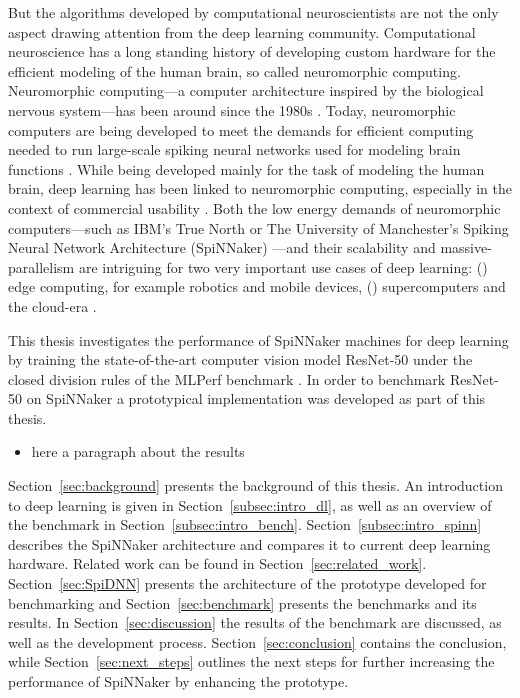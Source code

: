 \documentclass[]{article}
\begin{document}
But the algorithms developed by computational neuroscientists are not
the only aspect drawing attention from the deep learning community.
Computational neuroscience has a long standing history of
developing custom hardware for the efficient modeling of the human
brain, so called neuromorphic computing. Neuromorphic computing---a
computer architecture inspired by the biological nervous system---has
been around since the 1980s \citep{mead_1989}.
Today, neuromorphic computers are being developed to meet the
demands for efficient computing needed to run large-scale
spiking neural networks used for modeling brain
functions \citep{furber_2016}.
While being developed mainly for the task of modeling the human brain,
deep learning has been linked to neuromorphic computing,
especially in the context of commercial usability \citep{gomes_2017}.
Both the low energy demands of neuromorphic computers---such as IBM's
True North \citep{cassidy_et_al_2013} or The University of
Manchester's Spiking Neural Network Architecture (SpiNNaker)
\citep{furber_et_al_2006}---and their
scalability and massive-parallelism are intriguing for two very
important use cases of deep learning:
() edge computing, for example robotics
and mobile devices, () supercomputers and the
cloud-era \citep{gomes_2017}.

This thesis investigates the performance of SpiNNaker machines for
deep learning by training the state-of-the-art computer vision model
ResNet-50 \citep{he_et_al_2015} under the closed division rules of the
MLPerf benchmark \citep{mattson_et_al_2019}.
In order to benchmark ResNet-50 on SpiNNaker a prototypical
implementation was developed as part of this thesis.

\begin{itemize}
  \item here a paragraph about the results
\end{itemize}

Section~\ref{sec:background} presents the background of this thesis.
An introduction to deep learning is given in
Section~\ref{subsec:intro_dl}, as well as an overview
of the benchmark in Section~\ref{subsec:intro_bench}.
Section~\ref{subsec:intro_spinn} describes the SpiNNaker architecture
and compares it to current deep learning hardware.
Related work can be found in Section~\ref{sec:related_work}.
Section~\ref{sec:SpiDNN} presents the architecture of the
prototype developed for benchmarking and Section~\ref{sec:benchmark}
presents the benchmarks and its results.
In Section~\ref{sec:discussion} the results of the benchmark are
discussed, as well as the development process.
Section~\ref{sec:conclusion} contains the conclusion, while
Section~\ref{sec:next_steps} outlines the next steps for further
increasing the performance of SpiNNaker by enhancing the
prototype.
\end{document}

